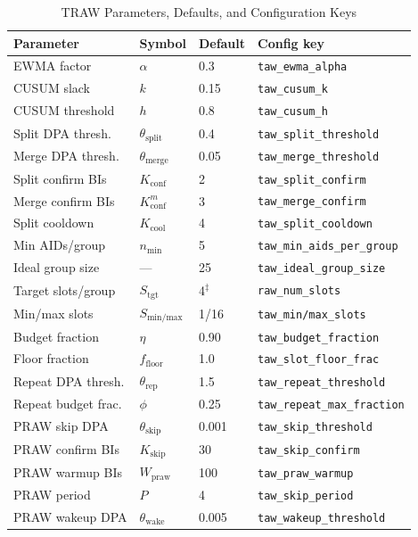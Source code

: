 \documentclass[journal]{IEEEtran}
\begin{document}
\begin{table}[!t]
\renewcommand{\arraystretch}{1.15}
\caption{TRAW Parameters, Defaults, and Configuration Keys}
\label{tab:params}
\centering
\begin{tabular}{@{}llll@{}}
\toprule
\textbf{Parameter} & \textbf{Symbol} & \textbf{Default} & \textbf{Config key} \\
\midrule
EWMA factor        & $\alpha$           & 0.3    & \texttt{taw\_ewma\_alpha} \\
CUSUM slack        & $k$                & 0.15   & \texttt{taw\_cusum\_k} \\
CUSUM threshold    & $h$                & 0.8    & \texttt{taw\_cusum\_h} \\
Split DPA thresh.  & $\theta_\mathrm{split}$ & 0.4 & \texttt{taw\_split\_threshold} \\
Merge DPA thresh.  & $\theta_\mathrm{merge}$ & 0.05 & \texttt{taw\_merge\_threshold} \\
Split confirm BIs  & $K_\mathrm{conf}$  & 2      & \texttt{taw\_split\_confirm} \\
Merge confirm BIs  & $K_\mathrm{conf}^m$& 3      & \texttt{taw\_merge\_confirm} \\
Split cooldown     & $K_\mathrm{cool}$  & 4      & \texttt{taw\_split\_cooldown} \\
Min AIDs/group     & $n_\mathrm{min}$   & 5      & \texttt{taw\_min\_aids\_per\_group} \\
Ideal group size   & ---                & 25     & \texttt{taw\_ideal\_group\_size} \\
Target slots/group & $S_\mathrm{tgt}$   & 4$^\ddagger$ & \texttt{raw\_num\_slots} \\
Min/max slots      & $S_\mathrm{min/max}$ & 1/16 & \texttt{taw\_min/max\_slots} \\
Budget fraction    & $\eta$             & 0.90   & \texttt{taw\_budget\_fraction} \\
Floor fraction     & $f_\mathrm{floor}$ & 1.0    & \texttt{taw\_slot\_floor\_frac} \\
Repeat DPA thresh. & $\theta_\mathrm{rep}$  & 1.5 & \texttt{taw\_repeat\_threshold} \\
Repeat budget frac.& $\phi$             & 0.25   & \texttt{taw\_repeat\_max\_fraction} \\
PRAW skip DPA      & $\theta_\mathrm{skip}$ & 0.001 & \texttt{taw\_skip\_threshold} \\
PRAW confirm BIs   & $K_\mathrm{skip}$  & 30     & \texttt{taw\_skip\_confirm} \\
PRAW warmup BIs    & $W_\mathrm{praw}$  & 100    & \texttt{taw\_praw\_warmup} \\
PRAW period        & $P$                & 4      & \texttt{taw\_skip\_period} \\
PRAW wakeup DPA    & $\theta_\mathrm{wake}$ & 0.005 & \texttt{taw\_wakeup\_threshold} \\
\bottomrule
\end{tabular}


\end{table}
\end{document}
